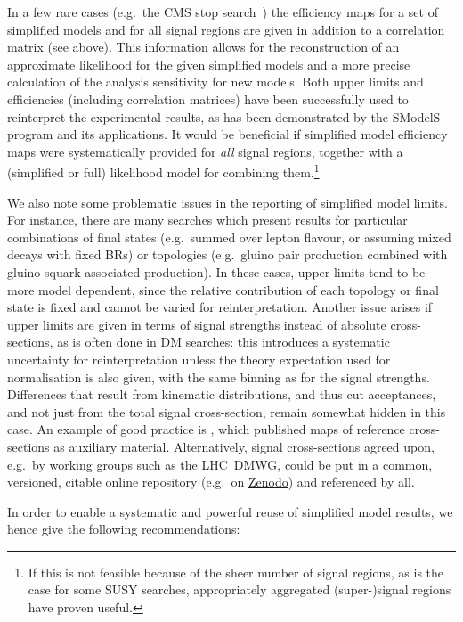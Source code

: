 \documentclass[a4paper,aps,prd,longbibliography,notitlepage,showpacs,amsmath,amssymb,superscriptaddress,nofootinbib,floatfix,11pt,preprintnumbers]{revtex4-1-mod}
\newcommand{\smodels}{\textsf{SModelS}\xspace}
\newcommand{\zenodo}{\textsf{Zenodo}\xspace}
\newcommand{\eg}{e.g.\xspace}
\renewcommand{\emph}[1]{\textit{#1}}
\begin{document}
In a few rare cases (\eg~the CMS stop search~\cite{CMS-PAS-SUS-16-052}) the efficiency maps for a set of simplified models and for all signal regions are given in addition to a correlation matrix (see above). This information allows for the reconstruction of an approximate likelihood for the given simplified models and a more precise calculation of the analysis sensitivity for new models.
Both upper limits and efficiencies (including correlation matrices) have been successfully used to reinterpret the experimental results, as has been demonstrated by the \smodels~\cite{Kraml:2013mwa,Ambrogi:2017neo,Ambrogi:2018ujg} program and its applications.
It would be beneficial if simplified model efficiency maps were systematically provided for \emph{all} signal regions, together with a (simplified or full) likelihood model for combining them.\footnote{If this is not feasible because of the sheer number of signal regions, as is the case for some SUSY searches,  appropriately aggregated (super-)signal regions have proven useful.}

We also note some problematic issues in the reporting of simplified model limits.
For instance, there are many searches which present results for particular combinations
of final states (\eg~summed over lepton flavour, or assuming mixed decays with fixed BRs) or topologies (\eg~gluino pair production combined with gluino-squark associated production). In these cases, upper
limits tend to be more model dependent, since the relative contribution of each topology or final state is fixed
and cannot be varied for reinterpretation.
Another issue arises if upper limits are given in terms of signal strengths instead of absolute cross-sections, as is often done in DM searches: this introduces a systematic uncertainty for reinterpretation unless the theory expectation used for normalisation is also given, with the same binning as for the signal strengths. Differences that result from kinematic distributions, and thus cut acceptances, and not just from the total signal cross-section, remain somewhat hidden in this case.
An example of
good practice is \cite{Aad:2019qnd}, which published maps of reference cross-sections as auxiliary material.
Alternatively, signal cross-sections agreed upon, \eg~by working groups such as the LHC~DMWG, could be put in a common, versioned, citable online repository (\eg~on \href{https://zenodo.org/}{\zenodo}) and referenced by all.


In order to enable a systematic and powerful reuse of simplified model results,
we hence give the following recommendations:
\end{document}
